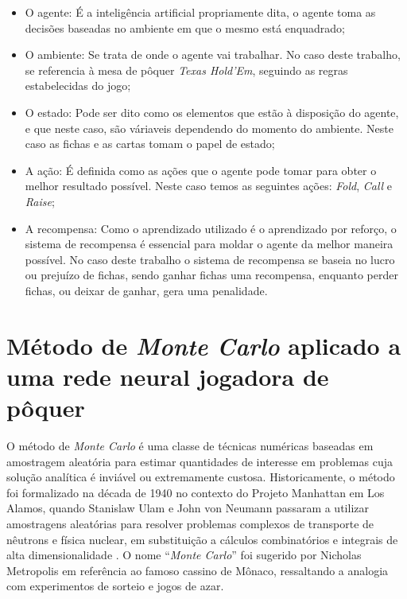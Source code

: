 \begin{itemize}
      \item O agente: É a inteligência artificial propriamente dita, o agente toma as decisões baseadas no ambiente em que o mesmo está enquadrado;

      \item O ambiente: Se trata de onde o agente vai trabalhar. No caso deste trabalho, se referencia à mesa de pôquer \textit{Texas Hold'Em}, seguindo as regras estabelecidas do jogo;

      \item O estado: Pode ser dito como os elementos que estão à disposição do agente, e que neste caso, são váriaveis dependendo do momento do ambiente. Neste caso as fichas e as cartas tomam o papel de estado;

      \item A ação: É definida como as ações que o agente pode tomar para obter o melhor resultado possível. Neste caso temos as seguintes ações: \textit{Fold}, \textit{Call} e \textit{Raise};

      \item A recompensa: Como o aprendizado utilizado é o aprendizado por reforço, o sistema de recompensa é essencial para moldar o agente da melhor maneira possível. No caso deste trabalho o sistema de recompensa se baseia no lucro ou prejuízo de fichas, sendo ganhar fichas uma recompensa, enquanto perder fichas, ou deixar de ganhar, gera uma penalidade.
\end{itemize}

\section{Método de \textit{Monte Carlo} aplicado a uma rede neural jogadora de pôquer}

O método de \textit{Monte Carlo} é uma classe de técnicas numéricas baseadas em amostragem aleatória para estimar quantidades de interesse em problemas cuja solução analítica é inviável ou extremamente custosa. Historicamente, o método foi formalizado na década de 1940 no contexto do Projeto Manhattan em Los Alamos, quando Stanislaw Ulam e John von Neumann passaram a utilizar amostragens aleatórias para resolver problemas complexos de transporte de nêutrons e física nuclear, em substituição a cálculos combinatórios e integrais de alta dimensionalidade . O nome ``\textit{Monte Carlo}'' foi sugerido por Nicholas Metropolis em referência ao famoso cassino de Mônaco, ressaltando a analogia com experimentos de sorteio e jogos de azar.

